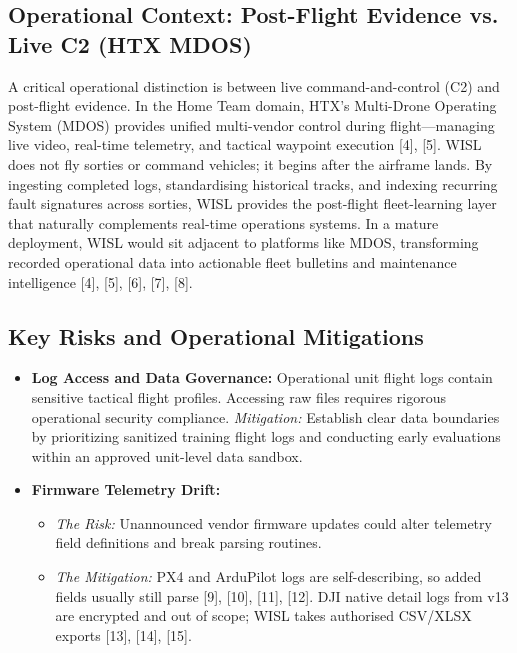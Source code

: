 \documentclass[11pt,a4paper]{article}
\begin{document}
\subsection{Operational Context: Post-Flight Evidence vs. Live C2 (HTX MDOS)}
A critical operational distinction is between live command-and-control (C2) and post-flight evidence. In the Home Team domain, HTX's Multi-Drone Operating System (MDOS) provides unified multi-vendor control during flight---managing live video, real-time telemetry, and tactical waypoint execution [4], [5]. WISL does not fly sorties or command vehicles; it begins after the airframe lands. By ingesting completed logs, standardising historical tracks, and indexing recurring fault signatures across sorties, WISL provides the post-flight fleet-learning layer that naturally complements real-time operations systems. In a mature deployment, WISL would sit adjacent to platforms like MDOS, transforming recorded operational data into actionable fleet bulletins and maintenance intelligence [4], [5], [6], [7], [8].

\subsection{Key Risks and Operational Mitigations}
\begin{itemize}
    \item \textbf{\color{accent}Log Access and Data Governance:} Operational unit flight logs contain sensitive tactical flight profiles. Accessing raw files requires rigorous operational security compliance. \textit{Mitigation:} Establish clear data boundaries by prioritizing sanitized training flight logs and conducting early evaluations within an approved unit-level data sandbox.
    \item \textbf{\color{accent}Firmware Telemetry Drift:}
    \begin{itemize}
        \item \textit{The Risk:} Unannounced vendor firmware updates could alter telemetry field definitions and break parsing routines.
        \item \textit{The Mitigation:} PX4 and ArduPilot logs are self-describing, so added fields usually still parse [9], [10], [11], [12]. DJI native detail logs from v13 are encrypted and out of scope; WISL takes authorised CSV/XLSX exports [13], [14], [15].
    \end{itemize}
\end{itemize}
\end{document}
